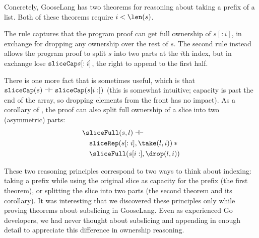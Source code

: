 Concretely, GooseLang has two theorems for reasoning about taking a prefix of a
list. Both of these theorems require $i < \len(s)$.
\begin{mathpar}

\end{mathpar}

The rule  captures that the program proof can get full ownership of
$s[:i]$, in exchange for dropping any ownership over the rest of $s$.
The second rule  instead allows the program proof to split $s$ into two
parts at the $i$th index, but in exchange lose $\sliceCap{s[:i]}$, the right
to append to the first half.

There is one more fact that is sometimes useful, which is that
$\sliceCap(s) \dashv\vdash \sliceCap(s[i:])$ (this is somewhat intuitive;
capacity is past the end of the array, so dropping elements from the front has
no impact). As a corollary of , the proof can also split full
ownership of a slice into two (asymmetric) parts:
\begin{align*}
  &\sliceFull(s, l) \dashv\vdash \\
  &\quad \sliceRep(s[:i], \take(l, i)) \sep {} \\
  &\quad \sliceFull(s[i:], \drop(l, i))
\end{align*}

These two reasoning principles correspond to two ways to think about indexing:
taking a prefix while using the original slice as capacity for the prefix (the
first theorem), or splitting the slice into two parts (the second theorem and
its corollary). It was interesting that we discovered these principles only
while proving theorems about subslicing in GooseLang. Even as experienced Go
developers, we had never thought about subslicing and appending in enough detail
to appreciate this difference in ownership reasoning.


